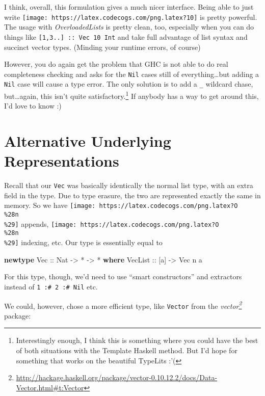 \documentclass[]{article}
\newenvironment{Shaded}{}{}
\newcommand{\DataTypeTok}[1]{\textcolor[rgb]{0.56,0.13,0.00}{#1}}
\newcommand{\KeywordTok}[1]{\textcolor[rgb]{0.00,0.44,0.13}{\textbf{#1}}}
\newcommand{\NormalTok}[1]{#1}
\newcommand{\OperatorTok}[1]{\textcolor[rgb]{0.40,0.40,0.40}{#1}}
\newcommand{\OtherTok}[1]{\textcolor[rgb]{0.00,0.44,0.13}{#1}}
\renewcommand{\href}[2]{#2\footnote{\url{#1}}}
\begin{document}
I think, overall, this formulation gives a much nicer interface. Being able to
just write \texttt{[image: https://latex.codecogs.com/png.latex?10]} is pretty
powerful. The usage with \emph{OverloadedLists} is pretty clean, too, especially
when you can do things like \texttt{{[}1,3..{]}\ ::\ Vec\ 10\ Int} and take full
advantage of list syntax and succinct vector types. (Minding your runtime
errors, of course)

However, you do again get the problem that GHC is not able to do real
completeness checking and asks for the \texttt{Nil} cases still of
everything\ldots but adding a \texttt{Nil} case will cause a type error. The
only solution is to add a \texttt{\_} wildcard chase, but\ldots again, this
isn't quite satisfactory.\footnote{Interestingly enough, I think this is
  something where you could have the best of both situations with the Template
  Haskell method. But I'd hope for something that works on the beautiful
  TypeLits :'(} If anybody has a way to get around this, I'd love to know :)

\hypertarget{alternative-underlying-representations}{%
\section{Alternative Underlying
Representations}\label{alternative-underlying-representations}}

Recall that our \texttt{Vec} was basically identically the normal list type,
with an extra field in the type. Due to type erasure, the two are represented
exactly the same in memory. So we have
\texttt{[image: https://latex.codecogs.com/png.latex?O\\\%28n\\\%29]} appends,
\texttt{[image: https://latex.codecogs.com/png.latex?O\\\%28n\\\%29]} indexing, etc.
Our type is essentially equal to

\begin{Shaded}
\begin{Highlighting}[]
\KeywordTok{newtype} \DataTypeTok{Vec}\OtherTok{ ::} \DataTypeTok{Nat} \OtherTok{{-}>} \OperatorTok{*} \OtherTok{{-}>} \OperatorTok{*} \KeywordTok{where}
    \DataTypeTok{VecList}\OtherTok{ ::}\NormalTok{ [a] }\OtherTok{{-}>} \DataTypeTok{Vec}\NormalTok{ n a}
\end{Highlighting}
\end{Shaded}

For this type, though, we'd need to use ``smart constructors'' and extractors
instead of \texttt{1\ :\#\ 2\ :\#\ Nil} etc.

We could, however, chose a more efficient type, like \texttt{Vector} from the
\emph{\href{http://hackage.haskell.org/package/vector-0.10.12.2/docs/Data-Vector.html\#t:Vector}{vector}}
package:
\end{document}
